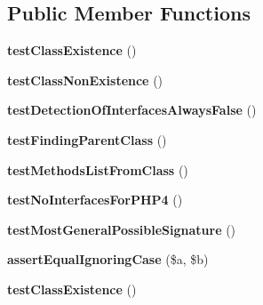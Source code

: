 \subsection*{Public Member Functions}
\begin{DoxyCompactItemize}
\item 
\hypertarget{class_test_of_reflection_afa17410ef13074098b1bdac6ad6e5016}{
{\bfseries testClassExistence} ()}
\label{class_test_of_reflection_afa17410ef13074098b1bdac6ad6e5016}

\item 
\hypertarget{class_test_of_reflection_ac5afd4886fe9f3ffd4cbc8327a85d88b}{
{\bfseries testClassNonExistence} ()}
\label{class_test_of_reflection_ac5afd4886fe9f3ffd4cbc8327a85d88b}

\item 
\hypertarget{class_test_of_reflection_a87d25412a9ed805c23ebfe96729d7e3b}{
{\bfseries testDetectionOfInterfacesAlwaysFalse} ()}
\label{class_test_of_reflection_a87d25412a9ed805c23ebfe96729d7e3b}

\item 
\hypertarget{class_test_of_reflection_a74fe47aa06210cf202a266bf215ac033}{
{\bfseries testFindingParentClass} ()}
\label{class_test_of_reflection_a74fe47aa06210cf202a266bf215ac033}

\item 
\hypertarget{class_test_of_reflection_ace77cc08c4111db7164ea099b1bad867}{
{\bfseries testMethodsListFromClass} ()}
\label{class_test_of_reflection_ace77cc08c4111db7164ea099b1bad867}

\item 
\hypertarget{class_test_of_reflection_acdd122b3995993ddcc0320c77a35f44f}{
{\bfseries testNoInterfacesForPHP4} ()}
\label{class_test_of_reflection_acdd122b3995993ddcc0320c77a35f44f}

\item 
\hypertarget{class_test_of_reflection_a4b9ff7d38f75154d410edb657acdb38b}{
{\bfseries testMostGeneralPossibleSignature} ()}
\label{class_test_of_reflection_a4b9ff7d38f75154d410edb657acdb38b}

\item 
\hypertarget{class_test_of_reflection_ac56c1aec5b48c3683bcfc64d827131d5}{
{\bfseries assertEqualIgnoringCase} (\$a, \$b)}
\label{class_test_of_reflection_ac56c1aec5b48c3683bcfc64d827131d5}

\item 
\hypertarget{class_test_of_reflection_afa17410ef13074098b1bdac6ad6e5016}{
{\bfseries testClassExistence} ()}
\label{class_test_of_reflection_afa17410ef13074098b1bdac6ad6e5016}


\end{DoxyCompactItemize}
